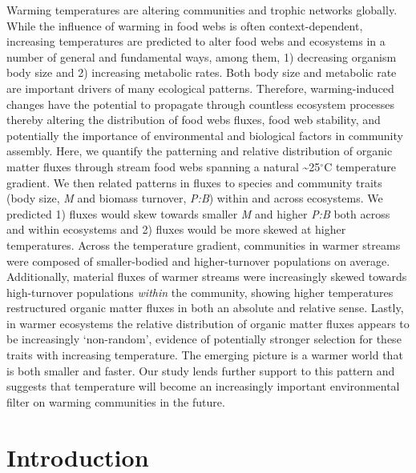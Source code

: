 \documentclass[
]{article}
\begin{document}
Warming temperatures are altering communities and trophic networks
globally. While the influence of warming in food webs is often
context-dependent, increasing temperatures are predicted to alter food
webs and ecosystems in a number of general and fundamental ways, among
them, 1) decreasing organism body size and 2) increasing metabolic
rates. Both body size and metabolic rate are important drivers of many
ecological patterns. Therefore, warming-induced changes have the
potential to propagate through countless ecosystem processes thereby
altering the distribution of food webs fluxes, food web stability, and
potentially the importance of environmental and biological factors in
community assembly. Here, we quantify the patterning and relative
distribution of organic matter fluxes through stream food webs spanning
a natural \textasciitilde25\(^\circ\)C temperature gradient. We then
related patterns in fluxes to species and community traits (body size,
\emph{M} and biomass turnover, \emph{P:B}) within and across ecosystems.
We predicted 1) fluxes would skew towards smaller \emph{M} and higher
\emph{P:B} both across and within ecosystems and 2) fluxes would be more
skewed at higher temperatures. Across the temperature gradient,
communities in warmer streams were composed of smaller-bodied and
higher-turnover populations on average. Additionally, material fluxes of
warmer streams were increasingly skewed towards high-turnover
populations \emph{within} the community, showing higher temperatures
restructured organic matter fluxes in both an absolute and relative
sense. Lastly, in warmer ecosystems the relative distribution of organic
matter fluxes appears to be increasingly `non-random', evidence of
potentially stronger selection for these traits with increasing
temperature. The emerging picture is a warmer world that is both smaller
and faster. Our study lends further support to this pattern and suggests
that temperature will become an increasingly important environmental
filter on warming communities in the future.

\newpage

\hypertarget{introduction}{%
\section{Introduction}\label{introduction}}
\end{document}
